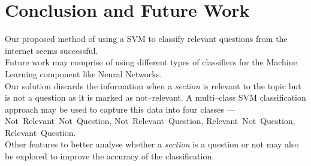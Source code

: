 \documentclass[a4paper,10pt]{report}
\begin{document}

\chapter{Conclusion and Future Work}

Our proposed method of using a SVM to classify relevant questions from the internet seems successful. \\

\noindent Future work may comprise of using different types of classifiers for the Machine Learning component like Neural Networks. \\

\noindent Our solution discards the information when a \emph{section} is relevant to the topic but is not a question as it is marked as not--relevant. 
A multi--class SVM classification approach may be used to capture this data into four classes --- Not~Relevant~Not~Question, Not~Relevant~Question, Relevant~Not~Question, Relevant~Question.\\

\noindent Other features to better analyse whether a \emph{section} is a question or not may also be explored to improve the accuracy of the classification.

\end{document}

